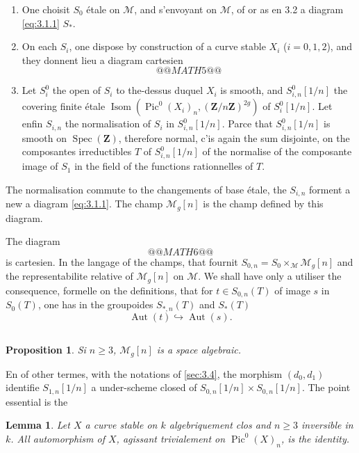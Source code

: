\documentclass[12pt,a4paper]{article}
\theoremstyle{plain}
\newtheorem{lemma}[theorem]{Lemma}
\newtheorem{proposition}[theorem]{Proposition}
\theoremstyle{definition}
\theoremstyle{remark}
\DeclareMathOperator{\Isom}{Isom}
\DeclareMathOperator{\Pic}{Pic}
\DeclareMathOperator{\Aut}{Aut}
\DeclareMathOperator{\Spec}{Spec}
\begin{document}
\begin{enumerate}[label=(\alph*)]
\item One choisit $S_0$ étale on $\mathcal{M}$, and s'envoyant on $\mathcal{M}$, of or as en 3.2 a diagram \eqref{eq:3.1.1} $S_*$.
\item On each $S_i$, one dispose by construction of a curve stable $X_i$ ($i = 0,1,2$), and they donnent lieu a diagram cartesien
\[
@@MATH5@@
\]
\item Let $S_i^0$ the open of $S_i$ to the-dessus duquel $X_i$ is smooth, and $S_{i,n}^0[1/n]$ the covering finite étale $\Isom(\Pic^0(X_i)_n, (\mathbf{Z}/n\mathbf{Z})^{2g})$ of $S_i^0[1/n]$. Let enfin $S_{i,n}$ the normalisation of $S_i$ in $S_{i,n}^0[1/n]$. Parce that $S_{i,n}^0[1/n]$ is smooth on $\Spec(\mathbf{Z})$, therefore normal, c'is again the sum disjointe, on the composantes irreductibles $T$ of $S_{i,n}^0[1/n]$ of the normalise of the composante image of $S_1$ in the field of the functions rationnelles of $T$.
\end{enumerate}

The normalisation commute to the changements of base étale, the $S_{i,n}$ forment a new a diagram \eqref{eq:3.1.1}. The champ $\mathcal{M}_g[n]$ is the champ defined by this diagram.

The diagram
\[
@@MATH6@@
\]
is cartesien. In the langage of the champs, that fournit $S_{0,n} = S_0 \times_{\mathcal{M}} \mathcal{M}_g[n]$ and the representabilite relative of $\mathcal{M}_g[n]$ on $\mathcal{M}$. We shall have only a utiliser the consequence, formelle on the definitions, that for $t \in S_{0,n}(T)$ of image $s$ in $S_0(T)$, one has in the groupoides $S_{*,n}(T)$ and $S_*(T)$
\begin{equation}\label{eq:3.4.1}
\Aut(t) \hookrightarrow \Aut(s).
\end{equation}

\subsection{}

\begin{proposition}
Si $n \geq 3$, $\mathcal{M}_g[n]$ is a space algebraic.
\end{proposition}

En of other termes, with the notations of \ref{sec:3.4}, the morphism $(d_0, d_1)$ identifie $S_{1,n}[1/n]$ a under-scheme closed of $S_{0,n}[1/n] \times S_{0,n}[1/n]$. The point essential is the

\begin{lemma}\label{lem:3.5.1}
Let $X$ a curve stable on $k$ algebriquement clos and $n \geq 3$ inversible in $k$. All automorphism of $X$, agissant trivialement on $\Pic^0(X)_n$, is the identity.
\end{lemma}
\end{document}
